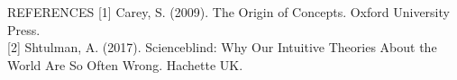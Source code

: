 \documentclass[final]{beamer}
\newlength{\colwidth}
\newlength{\widecolwidth}
\begin{document}
\begin{frame}[t]
\begin{columns}[t]
\begin{column}{\widecolwidth}
  \begin{block}{REFERENCES}
  \footnotesize
	[1] Carey, S. (2009). The Origin of Concepts. Oxford University Press.\\[.5ex]
	[2] Shtulman, A. (2017). Scienceblind: Why Our Intuitive Theories About the World Are So Often Wrong. Hachette UK.
  \end{block}

\end{column}
\end{columns}
\end{frame}
\end{document}

